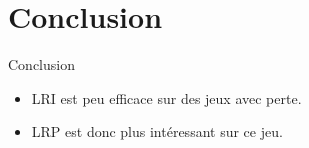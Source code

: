 \section{Conclusion}
\begin{frame}{Conclusion}
\begin{itemize}
    \item LRI est peu efficace sur des jeux avec perte.
    \item LRP est donc plus intéressant sur ce jeu.
\end{itemize}
\end{frame}